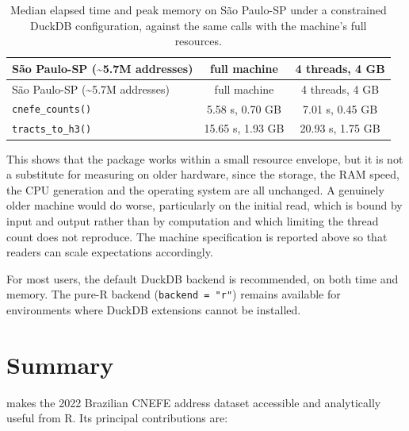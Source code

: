 \begin{longtable}[]{@{}lcc@{}}
\caption{\label{tab:tab-bench-modest} Median elapsed time and peak memory on São
Paulo-SP under a constrained DuckDB configuration, against the same
calls with the machine's full resources.}\tabularnewline
\toprule\noalign{}
São Paulo-SP (\textasciitilde5.7M addresses) & full machine & 4 threads, 4 GB \\
\midrule\noalign{}
\endfirsthead
\toprule\noalign{}
São Paulo-SP (\textasciitilde5.7M addresses) & full machine & 4 threads, 4 GB \\
\midrule\noalign{}
\endhead
\bottomrule\noalign{}
\endlastfoot
\texttt{cnefe\_counts()} & 5.58 s, 0.70 GB & 7.01 s, 0.45 GB \\
\texttt{tracts\_to\_h3()} & 15.65 s, 1.93 GB & 20.93 s, 1.75 GB \\
\end{longtable}

This shows that the package works within a small resource envelope, but
it is not a substitute for measuring on older hardware, since the
storage, the RAM speed, the CPU generation and the operating system are
all unchanged. A genuinely older machine would do worse, particularly on
the initial read, which is bound by input and output rather than by
computation and which limiting the thread count does not reproduce. The
machine specification is reported above so that readers can scale
expectations accordingly.

For most users, the default DuckDB backend is recommended, on both time
and memory. The pure-R backend (\texttt{backend\ =\ "r"}) remains available for
environments where DuckDB extensions cannot be installed.

\section{Summary}\label{summary}

 makes the 2022 Brazilian CNEFE address dataset
accessible and analytically useful from R. Its principal contributions
are:

